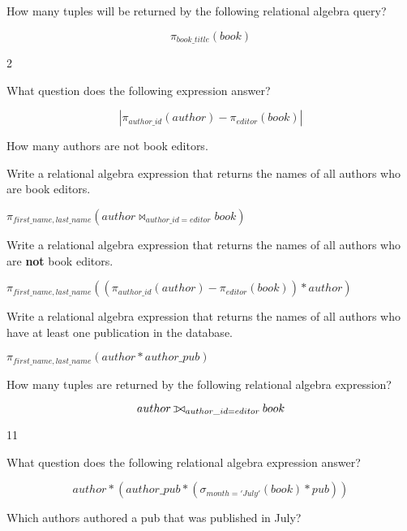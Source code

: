 \documentclass{exam}
\def\ojoin{\setbox0=\hbox{$\bowtie$}%
  \rule[-.02ex]{.25em}{.4pt}\llap{\rule[\ht0]{.25em}{.4pt}}}
\def\leftouterjoin{\mathbin{\ojoin\mkern-5.8mu\bowtie}}
\begin{document}
\begin{questions}

  \newpage

\question How many tuples will be returned by the following relational algebra query?

\[
\pi_{book\_title}(book)
\]

\begin{solution}[2in]
2
\end{solution}


\question What question does the following expression answer?

\[
|\pi_{author\_id}(author)  -  \pi_{editor}(book)|
\]

\begin{solution}[2in]
How many authors are not book editors.
\end{solution}

\question Write a relational algebra expression that returns the names of all authors who are book editors.

\begin{solution}
$\pi_{first\_name, last\_name}(author \bowtie_{author\_id = editor} book)$
\end{solution}

\newpage

\question Write a relational algebra expression that returns the names of all authors who are {\bf not} book editors.

\begin{solution}[2in]
$\pi_{first\_name, last\_name}((\pi_{author\_id}(author)  -  \pi_{editor}(book)) * author)$
\end{solution}


\question Write a relational algebra expression that returns the names of all authors who have at least one publication in the database.

\begin{solution}[2in]
$\pi_{first\_name, last\_name}(author * author\_pub)$
\end{solution}

\question How many tuples are returned by the following relational algebra expression?

\[
author \leftouterjoin_{author\_id = editor} book
\]

\begin{solution}[2in]
11
\end{solution}

\question What question does the following relational algebra expression answer?

\[
author * (author\_pub * (\sigma_{month = 'July'}(book) * pub))
\]


\begin{solution}
Which authors authored a pub that was published in July?
\end{solution}


\end{questions}
\end{document}
